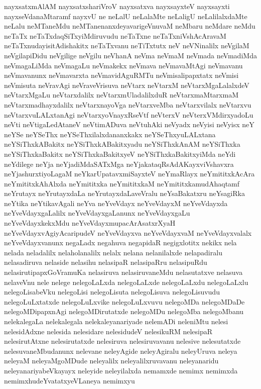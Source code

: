 {nayxsatxmAlAM
nayxsatxshariVroV
nayxsatxva
nayxsayxteV
nayxsayxti
nayxseVdanaMtaramf
nayxvU
ne
neLalU
neLalaMte
neLaligU
neLalilalxdaMte
neLalu
neMTaneMdu
neMTanenanxdeyavarigeVnuvaM
neMbaru
neMdare
neMdu
neTaTx
neTaTxdaqSiTxyiMdiruvudu
neTaTxne
neTaTxniVshAcAravaM
neTaTxnudayisitAdishakitx
neTaTxvanu
neTiTxtutx
neV
neVNinalilx
neVgilaM
neVgilapiDidu
neVgilige
neVgilu
neVhanA
neVma
neVmaM
neVmada
neVmadiMda
neVmagaLiMda
neVmagaLu
neVmakekx
neVmava
neVmavaMtAgi
neVmavanu
neVmavanunx
neVmavarxta
neVmavidAguRMTu
neVmisalipapxtatx
neVmisi
neVmisuta
neVravAgi
neVraveVrisuva
neVtarx
neVtarxM
neVtarxMgaLalalxdeV
neVtarxMgaLu
neVtarxdalilx
neVtarxmUladalilxduR
neVtarxmaMtarxmaM
neVtarxmadhayxdalilx
neVtarxnayoVga
neVtarxveMba
neVtarxvilalx
neVtarxvu
neVtarxvuLALxtanAgi
neVtarxyoVnayxRseVtf
neVterxV
neVterxVMdirxyadoLu
neVti
neVtigaLedAtaneV
neVtimADuva
neVtuhAki
neVyadx
neVyisi
neVyisx
neY
neYSe
neYSeThx
neYSeThxilalxdananxkakx
neYSeThxyuLALxtana
neYSiThxkABakitx
neYSiThxkABakitxyadu
neYSiThxkAnAM
neYSiThxka
neYSiThxkaBakitx
neYSiThxkaBakitxyeV
neYSiThxkaBakitxyiMda
neYdi
neYdilege
neYja
neYjadiMdaSATxMga
neYjakataqRsAdAKayxviVshavxra
neYjashurxtiyoLagaM
neYkarUpatavxmiSayxteV
neYmaRlayx
neYmititxkAcAra
neYmititxkAhAlxda
neYmititxka
neYmititxkaM
neYmititxkamudAhaqtamf
neYrutayx
neYrutayxdaLa
neYrutayxdaLaveVralu
neYsaBakatxru
neYsagiRka
neYtika
neYtikavAgali
neYva
neYveVdayx
neYveVdayxM
neYveVdayxda
neYveVdayxgaLalilx
neYveVdayxgaLanunx
neYveVdayxgaLu
neYveVdayxkekxMdu
neYveVdayxmupacArAsatxrXyaH
neYveVdayxvAgiyAcaripudeV
neYveVdayxva
neYveVdayxvaM
neYveVdayxvalalx
neYveVdayxvanunx
negaLadx
negahuva
negapidaR
negigxlotitx
nekikx
nela
nelada
neladalilx
nelaholanalilx
nelalx
nelana
nelanilalxde
nelapadiralu
nelasadiruva
nelaside
nelasihu
nelasipaR
nelasipaRru
nelasipuRdu
nelasirutipapxGoVramuKa
nelasiruva
nelasiruvaneMdu
nelasutatxve
nelasuva
nelaveVnu
nele
nelege
nelegoLaLxda
nelegoLaLxde
nelegoLaLxdu
nelegoLaLxlu
nelegoLisabeVku
nelegoLisi
nelegoLisuta
nelegoLisuva
nelegoLisuvudu
nelegoLuLxtatxde
nelegoLuLxvike
nelegoLuLxvuvu
nelegoMDa
nelegoMDaDe
nelegoMDipapxnAgi
nelegoMDirutatxde
nelegoMDu
nelegoMba
nelegoMbanu
nelekalegaLa
nelekalegala
nelekaleyanariyade
nelemADi
neleniMtu
nelesi
nelesidAdxne
nelesida
nelesidare
nelesidudeV
nelesikuRM
nelesipaR
nelesirutAtxne
nelesirutatxde
nelesiruva
nelesiruvavanu
nelesive
nelesutatxde
nelesuvaneMbudanunx
nelevane
neleyAgide
neleyAgiralu
neleyUruva
neleya
neleyaM
neleyaMgoMDude
neleyalilx
neleyalilxruvavanu
neleyanaridu
neleyanariyabeVkayayx
neleyide
neleyilalxda
nemamxde
nemimx
nemimxda
nemimxhudeYvatatxyeVLaneya
nemimxyu
}

